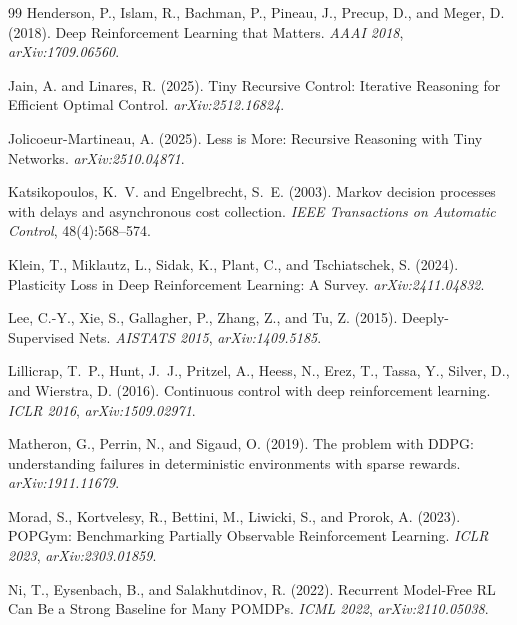\documentclass[11pt]{article}
\begin{document}
\begin{thebibliography}{99}
Henderson, P., Islam, R., Bachman, P., Pineau, J., Precup, D., and Meger, D. (2018).
\newblock Deep Reinforcement Learning that Matters.
\newblock \emph{AAAI 2018}, \emph{arXiv:1709.06560}.

Jain, A. and Linares, R. (2025).
\newblock Tiny Recursive Control: Iterative Reasoning for Efficient Optimal Control.
\newblock \emph{arXiv:2512.16824}.

Jolicoeur-Martineau, A. (2025).
\newblock Less is More: Recursive Reasoning with Tiny Networks.
\newblock \emph{arXiv:2510.04871}.

Katsikopoulos, K.~V. and Engelbrecht, S.~E. (2003).
\newblock Markov decision processes with delays and asynchronous cost collection.
\newblock \emph{IEEE Transactions on Automatic Control}, 48(4):568--574.

Klein, T., Miklautz, L., Sidak, K., Plant, C., and Tschiatschek, S. (2024).
\newblock Plasticity Loss in Deep Reinforcement Learning: A Survey.
\newblock \emph{arXiv:2411.04832}.

Lee, C.-Y., Xie, S., Gallagher, P., Zhang, Z., and Tu, Z. (2015).
\newblock Deeply-Supervised Nets.
\newblock \emph{AISTATS 2015}, \emph{arXiv:1409.5185}.

Lillicrap, T.~P., Hunt, J.~J., Pritzel, A., Heess, N., Erez, T., Tassa, Y., Silver, D., and Wierstra, D. (2016).
\newblock Continuous control with deep reinforcement learning.
\newblock \emph{ICLR 2016}, \emph{arXiv:1509.02971}.

Matheron, G., Perrin, N., and Sigaud, O. (2019).
\newblock The problem with DDPG: understanding failures in deterministic environments with sparse rewards.
\newblock \emph{arXiv:1911.11679}.

Morad, S., Kortvelesy, R., Bettini, M., Liwicki, S., and Prorok, A. (2023).
\newblock POPGym: Benchmarking Partially Observable Reinforcement Learning.
\newblock \emph{ICLR 2023}, \emph{arXiv:2303.01859}.

Ni, T., Eysenbach, B., and Salakhutdinov, R. (2022).
\newblock Recurrent Model-Free RL Can Be a Strong Baseline for Many POMDPs.
\newblock \emph{ICML 2022}, \emph{arXiv:2110.05038}.


\end{thebibliography}
\end{document}
